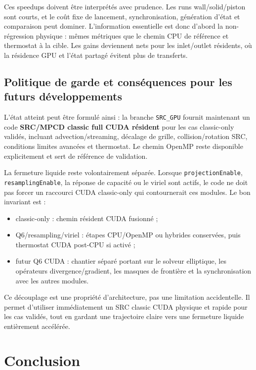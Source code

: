 \documentclass[11pt,a4paper]{article}
\begin{document}
Ces speedups doivent être interprétés avec prudence. Les runs wall/solid/piston sont courts, et le coût fixe de lancement, synchronisation, génération d'état et comparaison peut dominer. L'information essentielle est donc d'abord la non-régression physique : mêmes métriques que le chemin CPU de référence et thermostat à la cible. Les gains deviennent nets pour les inlet/outlet résidents, où la résidence GPU et l'état partagé évitent plus de transferts.

\subsection{Politique de garde et conséquences pour les futurs développements}

L'état atteint peut être formulé ainsi : la branche \texttt{SRC\_GPU} fournit maintenant un code \textbf{SRC/MPCD classic full CUDA résident} pour les cas classic-only validés, incluant advection/streaming, décalage de grille, collision/rotation SRC, conditions limites avancées et thermostat. Le chemin OpenMP reste disponible explicitement et sert de référence de validation.

La fermeture liquide reste volontairement séparée. Lorsque \texttt{projectionEnable}, \texttt{resamplingEnable}, la réponse de capacité ou le viriel sont actifs, le code ne doit pas forcer un raccourci CUDA classic-only qui contournerait ces modules. Le bon invariant est :
\begin{itemize}[nosep]
  \item classic-only : chemin résident CUDA fusionné ;
  \item Q6/resampling/viriel : étapes CPU/OpenMP ou hybrides conservées, puis thermostat CUDA post-CPU si activé ;
  \item futur Q6 CUDA : chantier séparé portant sur le solveur elliptique, les opérateurs divergence/gradient, les masques de frontière et la synchronisation avec les autres modules.
\end{itemize}

Ce découplage est une propriété d'architecture, pas une limitation accidentelle. Il permet d'utiliser immédiatement un SRC classic CUDA physique et rapide pour les cas validés, tout en gardant une trajectoire claire vers une fermeture liquide entièrement accélérée.


\section{Conclusion}
\end{document}
